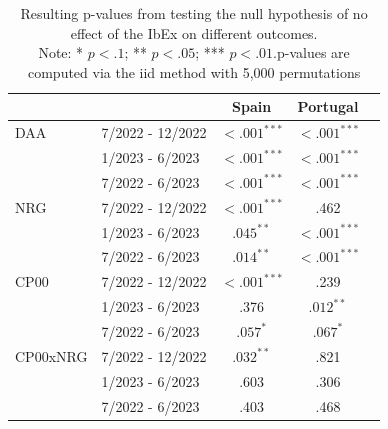 \documentclass[12pt,a4paper]{article}
\begin{document}
\begin{table}[!t]
    \centering
    \setlength{\tabcolsep}{20pt}
    \renewcommand{\arraystretch}{1.5}
    \begin{tabular}{llccc}
        \toprule
        \toprule
        & & Spain & Portugal \\
        \midrule
        DAA & 7/2022 - 12/2022 & $<.001^{\ast\ast\ast}$ & $<.001^{\ast\ast\ast}$ \\
        & 1/2023 - 6/2023 & $<.001^{\ast\ast\ast}$ & $<.001^{\ast\ast\ast}$ \\     
        & 7/2022 - 6/2023 & $<.001^{\ast\ast\ast}$ & $<.001^{\ast\ast\ast}$ \\ 
        \midrule
        NRG & 7/2022 - 12/2022 & $<.001^{\ast\ast\ast}$ & .462 \\   
        & 1/2023 - 6/2023 & $.045^{\ast\ast}$ & $<.001^{\ast\ast\ast}$ \\         
        & 7/2022 - 6/2023 & $.014^{\ast\ast}$ & $<.001^{\ast\ast\ast}$ \\ 
        \midrule
        CP00 & 7/2022 - 12/2022 & $<.001^{\ast\ast\ast}$ & .239 \\
        & 1/2023 - 6/2023 & .376 & $.012^{\ast\ast}$ \\
        & 7/2022 - 6/2023 & $.057^{\ast}$ & $.067^{\ast}$ \\ 
        \midrule
        CP00xNRG & 7/2022 - 12/2022 & $.032^{\ast\ast}$ & .821 \\
        & 1/2023 - 6/2023 & .603 & .306 \\
        & 7/2022 - 6/2023 & .403 & .468 \\  
        \bottomrule
        \bottomrule
    \end{tabular}
    \caption{Resulting p-values from testing the null hypothesis of no effect of the IbEx on different outcomes.\\
    Note: * $p < .1$; ** $p < .05$; *** $p < .01$.p-values are computed via the iid method with 5,000 permutations \parencite{chernozhukov2021}}
    \label{tab:p_vals}
\end{table}
\end{document}
